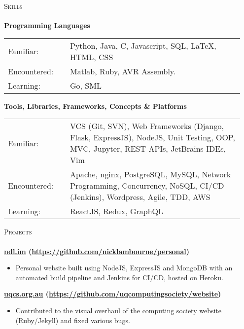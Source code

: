 \documentclass[a4paper]{article}
\newcommand{\lineunder} {
    \vspace*{-8pt} \\
    \hspace*{-18pt} \hrulefill \\
}
\newcommand{\header} [1] {
    {\hspace*{-18pt}\vspace*{6pt} \textsc{#1}}
    \vspace*{-6pt} \lineunder
}
\newenvironment{singleitem}
{   \small
    \vspace{-2.6pt}
    \begin{itemize}
    \setlength{\itemsep}{0pt}
    \setlength{\parskip}{0pt}
    \setlength{\parsep}{0pt}   }
{\end{itemize} \vspace{-2.6pt}	}
\begin{document}
\vspace{-1mm}
\header{Skills}
\textbf{Programming Languages}
\begin{tabular}{p{0.25\linewidth}p{0.7\linewidth}}
	\small Familiar: & \small Python, Java, C, Javascript, SQL, \LaTeX, HTML, CSS \\
	\small Encountered: & \small Matlab, Ruby, AVR Assembly.   \\
	\small Learning:   & \small Go, SML\vspace{2mm}                                          \\	
\end{tabular}

\textbf{Tools, Libraries, Frameworks, Concepts \& Platforms}
\begin{tabular}{p{0.25\linewidth}p{0.7\linewidth}}
	\small Familiar: & \small VCS (Git, SVN), Web Frameworks (Django, Flask, ExpressJS), NodeJS, Unit Testing, OOP, MVC, Jupyter, REST APIs, JetBrains IDEs, Vim \\
	\small Encountered: & \small Apache, nginx, PostgreSQL, MySQL, Network Programming, Concurrency, NoSQL, CI/CD (Jenkins), Wordpress, Agile, TDD, AWS  \\
	\small Learning: & \small ReactJS, Redux, GraphQL \\
\end{tabular}

\vspace{2mm}


\vspace{1mm}

\header{Projects}
\vspace{1mm}
\textbf{\href{https://ndl.im}{ndl.im} (\href{https://github.com/nicklambourne/personal}{https://github.com/nicklambourne/personal})}
\begin{singleitem}
	\item Personal website built using NodeJS, ExpressJS and MongoDB with an automated build pipeline and Jenkins for CI/CD, hosted on Heroku.
\end{singleitem}

\textbf{\href{https://uqcs.org.au}{uqcs.org.au} (\href{https://github.com/uqcomputingsociety/website}{https://github.com/uqcomputingsociety/website})}
\begin{singleitem}
	\item Contributed to the visual overhaul of the computing society website (Ruby/Jekyll) and fixed various bugs.
\end{singleitem}
\end{document}
